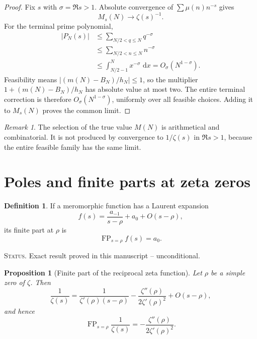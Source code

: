 \documentclass[11pt]{amsart}
\numberwithin{equation}{section}
\theoremstyle{plain}
\newtheorem{proposition}[theorem]{Proposition}
\theoremstyle{definition}
\newtheorem{definition}[theorem]{Definition}
\theoremstyle{remark}
\newtheorem{remark}[theorem]{Remark}
\DeclareMathOperator{\FP}{FP}
\newcommand{\1}{\mathbf{1}}
\newcommand{\dd}{\,\mathrm{d}}
\newcommand{\statusnote}[1]{%
  \par\smallskip\noindent
  \begingroup\footnotesize\textsc{Status.} #1\endgroup
  \par\smallskip}
\begin{document}
\begin{proof}
Fix \(s\) with \(\sigma=\Re s>1\).  Absolute convergence of
\(\sum\mu(n)n^{-s}\) gives
\begin{equation}
M_s(N)\longrightarrow\zeta(s)^{-1}.
\label{eq:halfplane_Ms_limit_detailed}
\end{equation}
For the terminal prime polynomial,
\begin{align}
|P_N(s)|
&\leq
\sum_{N/2<q\leq N}q^{-\sigma}
\label{eq:halfplane_P_bound_one}
\\
&\leq
\sum_{N/2<n\leq N}n^{-\sigma}
\label{eq:halfplane_P_bound_two}
\\
&\leq
\int_{N/2-1}^{N}x^{-\sigma}\,\dd x
=
O_\sigma(N^{1-\sigma}).
\label{eq:halfplane_P_bound_three}
\end{align}
Feasibility means \(|(m(N)-B_N)/h_N|\leq1\), so the multiplier
\(1+(m(N)-B_N)/h_N\) has absolute value at most two.  The entire terminal
correction is therefore \(O_\sigma(N^{1-\sigma})\), uniformly over all
feasible choices.  Adding it to \(M_s(N)\) proves the common limit.
\end{proof}

\begin{remark}
\label{rem:arithmetic_not_complex_selection}
The selection of the true value \(M(N)\) is arithmetical and
combinatorial.  It is not produced by convergence to \(1/\zeta(s)\) in
\(\Re s>1\), because the entire feasible family has the same limit.
\end{remark}

\section{Poles and finite parts at zeta zeros}
\label{sec:finite_parts}

\begin{definition}
\label{def:finite_part}
If a meromorphic function has a Laurent expansion
\begin{equation}
f(s)
=
\frac{a_{-1}}{s-\rho}+a_0+O(s-\rho),
\label{eq:finite_part_laurent}
\end{equation}
its finite part at \(\rho\) is
\begin{equation}
\FP_{s=\rho}f(s)=a_0.
\label{eq:finite_part_definition}
\end{equation}
\end{definition}

\statusnote{Exact result proved in this manuscript -- unconditional.}
\begin{proposition}[Finite part of the reciprocal zeta function]
\label{prop:finite_part_inverse_zeta}
Let \(\rho\) be a simple zero of \(\zeta\).  Then
\begin{equation}
\frac1{\zeta(s)}
=
\frac{1}{\zeta'(\rho)(s-\rho)}
-
\frac{\zeta''(\rho)}{2\zeta'(\rho)^2}
+
O(s-\rho),
\label{eq:inverse_zeta_laurent}
\end{equation}
and hence
\begin{equation}
\FP_{s=\rho}\frac1{\zeta(s)}
=
-\frac{\zeta''(\rho)}{2\zeta'(\rho)^2}.
\label{eq:inverse_zeta_finite_part}
\end{equation}
\end{proposition}
\end{document}
